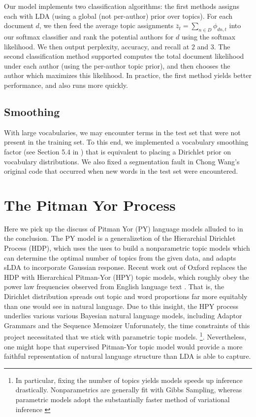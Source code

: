 \documentclass[14pt]{article} %
\theoremstyle{plain}
\theoremstyle{definition}
\theoremstyle{remark}
\begin{document}
\begin{appendix}
Our model implements two classification algorithms: the first methods assigns each with LDA (using a global (not per-author) prior over topics). For each document $d$, we then feed the average topic assignments $\bar{z}_{t}=\sum_{n\in D}\phi_{dn,t}$ into our softmax classifier and rank the potential authors for $d$ using the softmax likelihood. We then output perplexity, accuracy, and recall at $2$ and $3$. The second classification method supported computes the total document likelihood under each author (using the per-author topic prior), and then chooses the author which maximizes this likelihood. In practice, the first method yields better performance, and also runs more quickly.
 
\subsection{Smoothing}
\label{appendix:smoothing}
With large vocabularies, we may encounter terms in the test set that were not present in the training set. To this end, we implemented a vocabulary smoothing factor (see Section 5.4 in \cite{Blei2003}) that is equivalent to placing a Dirichlet prior on vocabulary distributions. We also fixed a segmentation fault in Chong Wang's original code that occurred when new words in the test set were encountered.

\section{The Pitman Yor Process}
Here we pick up the discuss of Pitman Yor (PY) language models alluded to in the conclusion. The PY model is a generalizetion of the Hierarchial Dirichlet Process (HDP), which  \cite{blei2003hierarchical} uses the uses to build a nonparametric topic models which can determine the optimal number of topics from the given data, and \cite{perotte2011hierarchically} adapts sLDA to incorporate Gaussian response. Recent work out of Oxford replaces the HDP with Hierarchical Pitman-Yor (HPY) topic models, which roughly obey the power law frequencies observed from English language text \cite{teh2006hierarchical}. That is, the Dirichlet distribution spreads out topic and word proportions far more equitably than one would see in natural language. Due to this insight, the HPY process underlies various various Bayesian natural language models, including Adaptor Grammars \cite{johnson2007adaptor} and the Sequence Memoizer\cite{wood2009stochastic}  Unforunately, the time constraints of this project necessitated that we stick with parametric topic models. \footnote{In particular, fixing the number of topics yields models speeds up inference drastically. Nonparametrics are generally fit with Gibbs Sampling, whereas parametric models adopt the substantially faster method of variational inference \cite{wainwright2008graphical}}. Nevertheless, one might hope that supervised Pitman-Yor topic model would provide a more faithful representation of natural language structure than LDA is able to capture. 


\end{appendix}
\end{document}
